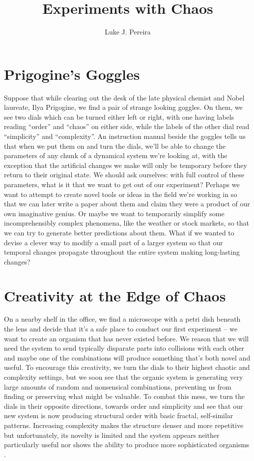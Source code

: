 \documentclass{article}
\title{\vspace{-3cm} Experiments with Chaos}
\author{Luke J. Pereira}
\date{}
\begin{document}
\maketitle

\section{Prigogine's Goggles}
Suppose that while clearing out the desk of the late physical chemist and Nobel laureate, Ilya Prigogine, we find a pair of strange looking goggles. On them, we see two dials which can be turned either left or right, with one having labels reading ``order'' and ``chaos'' on either side, while the labels of the other dial read ``simplicity'' and ``complexity''. An instruction manual beside the goggles tells us that when we put them on and turn the dials, we'll be able to change the parameters of any chunk of a dynamical system we're looking at, with the exception that the artificial changes we make will only be temporary before they return to their original state. We should ask ourselves: with full control of these parameters, what is it that we want to get out of our experiment? Perhaps we want to attempt to create novel tools or ideas in the field we're working in so that we can later write a paper about them and claim they were a product of our own imaginative genius. Or maybe we want to temporarily simplify some incomprehensibly complex phenomena, like the weather or stock markets, so that we can try to generate better predictions about them. What if we wanted to devise a clever way to modify a small part of a larger system so that our temporal changes propagate throughout the entire system making long-lasting changes? 

\section{Creativity at the Edge of Chaos}

On a nearby shelf in the office, we find a microscope with a petri dish beneath the lens and decide that it's a safe place to conduct our first experiment -- we want to create an organism that has never existed before. We reason that we will need the system to send typically disparate parts into collisions with each other and maybe one of the combinations will produce something that's both novel and useful. To encourage this creativity, we turn the dials to their highest chaotic and complexity settings, but we soon see that the organic system is generating very large amounts of random and nonsensical combinations, preventing us from finding or preserving what might be valuable. To combat this mess, we turn the dials in their opposite directions, towards order and simplicity and see that our new system is now producing structural order with basic fractal, self-similar patterns. Increasing complexity makes the structure denser and more repetitive but unfortunately, its novelty is limited and the system appears neither particularly useful nor shows the ability to produce more sophisticated organisms \cite{eoc}.
\end{document}
